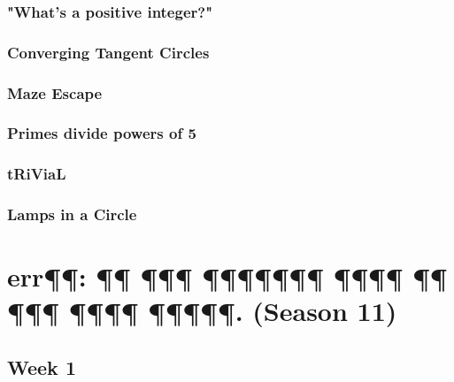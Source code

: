 \documentclass[titlepage=true]{scrartcl}
\begin{document}
        \subsubsection{"What's a positive integer?"}
        \label{10.2.2}  
        
        \newpage
			
        \subsubsection{Converging Tangent Circles}
        \label{10.2.3}  
        
        \newpage

        \subsubsection{Maze Escape}
        \label{10.2.4}
        
        \newpage 

        \subsubsection{Primes divide powers of 5}
        \label{10.2.5}  
        
        \newpage

        \subsubsection{tRiViaL}
        \label{10.2.6}  
        
        \newpage

        \subsubsection{Lamps in a Circle}
        \label{10.2.7}  
        
        \newpage

\section{err¶¶: ¶¶ ¶¶¶ ¶¶¶¶¶¶¶ ¶¶¶¶ ¶¶ ¶¶¶ ¶¶¶¶ ¶¶¶¶¶. (Season 11)}

    \subsection{Week 1}
\end{document}
